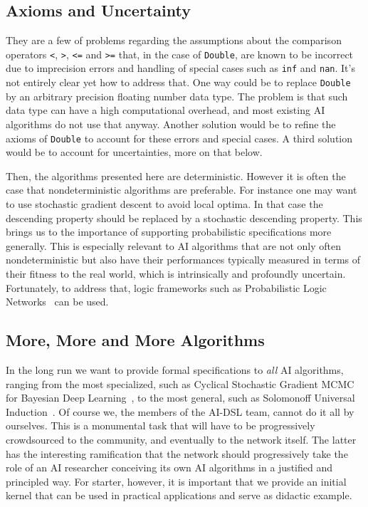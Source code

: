 \documentclass[]{report}
\begin{document}
\subsection{Axioms and Uncertainty}
They are a few of problems regarding the assumptions about the
comparison operators \texttt{<}, \texttt{>}, \texttt{<=} and
\texttt{>=} that, in the case of \texttt{Double}, are known to be
incorrect due to imprecision errors and handling of special cases such
as \texttt{inf} and \texttt{nan}.  It's not entirely clear yet how to
address that.  One way could be to replace \texttt{Double} by an
arbitrary precision floating number data type.  The problem is that
such data type can have a high computational overhead, and most
existing AI algorithms do not use that anyway.  Another solution would
be to refine the axioms of \texttt{Double} to account for these errors
and special cases.  A third solution would be to account for
uncertainties, more on that below.

Then, the algorithms presented here are deterministic.  However it is
often the case that nondeterministic algorithms are preferable.  For
instance one may want to use stochastic gradient descent to avoid
local optima.  In that case the descending property should be replaced
by a stochastic descending property.  This brings us to the importance
of supporting probabilistic specifications more generally.  This is
especially relevant to AI algorithms that are not only often
nondeterministic but also have their performances typically measured
in terms of their fitness to the real world, which is intrinsically
and profoundly uncertain.  Fortunately, to address that, logic
frameworks such as Probabilistic Logic Networks~\cite{Goertzel09PLN}
can be used.\\

\subsection{More, More and More Algorithms}
In the long run we want to provide formal specifications to \emph{all}
AI algorithms, ranging from the most specialized, such as Cyclical
Stochastic Gradient MCMC for Bayesian Deep Learning~\cite{Zhang2020},
to the most general, such as Solomonoff Universal
Induction~\cite{Solomonoff1964}.  Of course we, the members of the
AI-DSL team, cannot do it all by ourselves.  This is a monumental task
that will have to be progressively crowdsourced to the community, and
eventually to the network itself.  The latter has the interesting
ramification that the network should progressively take the role of an
AI researcher conceiving its own AI algorithms in a justified and
principled way.  For starter, however, it is important that we provide
an initial kernel that can be used in practical applications and serve
as didactic example.
\end{document}
